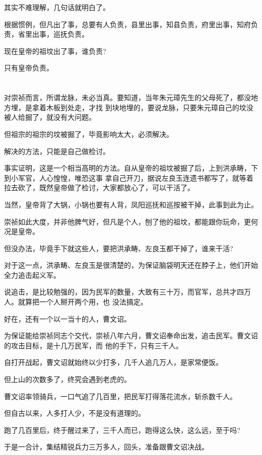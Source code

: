 \documentclass[11pt,a4paper,onecolumn]{article}
\begin{document}
其实不难理解，几句话就明白了。

根据惯例，但凡出了事，总要有人负责，县里出事，知县负责，府里出事，知府负责，省里出事，巡抚负责。

现在皇帝的祖坟出了事，谁负责?

只有皇帝负责。

\section[\thesection]{}

对崇祯而言，所谓龙脉，未必当真。要知道，当年朱元璋先生的父母死了，都没地方埋，是拿着木板到处走，才找
到块地埋的，要说龙脉，只要朱元璋自己的坟没被人给掘了，就没有大问题。

但祖宗的祖宗的坟被掘了，毕竟影响太大，必须解决。

解决的方法，只能是自己做检讨。

事实证明，这是一个相当高明的方法。自从皇帝的祖坟被掘了后，上到洪承畴，下到小军官，人心惶惶，唯恐这事
拿自己开刀，据说左良玉连遗书都写了，就等着拉去砍了，既然皇帝做了检讨，大家都放心了，可以干活了。

当然，皇帝背了大锅，小锅也要有人背，凤阳巡抚和巡按被干掉，此事到此为止。

崇祯如此大度，并非他脾气好，但凡是个人，刨了他的祖坟，都能跟你玩命，更何况是皇帝。

但没办法，毕竟手下就这些人，要把洪承畴、左良玉都干掉了，谁来干活?

对于这一点，洪承畴、左良玉是很清楚的，为保证脑袋明天还在脖子上，他们开始全力追击起义军。

说追击，是比较勉强的，因为民军的数量，大致有三十万，而官军，总共才四万人。就算把一个人掰开两个用，也
没法搞定。

好在，还有一个以一当十的人，曹文诏。

为保证能给崇祯同志个交代，崇祯八年六月，曹文诏奉命出发，追击民军。曹文诏的攻击目标，是十几万民军，而
他的手下，只有三千人。

自打开战起，曹文诏就始终以少打多，几千人追几万人，是家常便饭。

但上山的次数多了，终究会遇到老虎的。

曹文诏率领骑兵，一口气追了几百里，把民军打得落花流水，斩杀数千人。

但自古以来，人多打人少，不是没有道理的。

跑了几百里后，终于醒过来了，三千人而已，跑得这么快，这么远，至于吗?

于是一合计，集结精锐兵力三万多人，回头，准备跟曹文诏决战。
\end{document}
